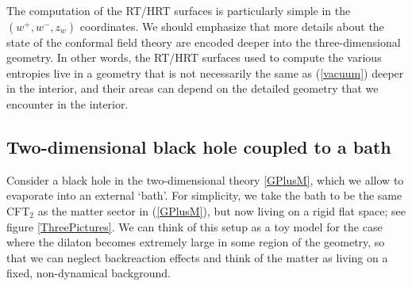 \documentclass[11pt]{article}
\def\nref#1{(\ref{#1})}
\begin{document}
The computation of the RT/HRT surfaces is particularly simple in the $(w^+,w^-,z_w)$ coordinates.
We should emphasize that more details about the state of the conformal field theory are encoded deeper into the three-dimensional geometry.
In other words, the RT/HRT surfaces used to compute the various entropies live in a geometry that is not necessarily the same as \nref{vacuum} deeper in the interior, and their areas can depend on the detailed geometry that we  encounter in the interior.

\subsection{Two-dimensional black hole coupled to a bath}

Consider a black hole in the two-dimensional theory \eqref{GPlusM}, which we allow to evaporate into an external `bath'.
For simplicity, we take the bath to be the same CFT$_2$ as the matter sector in (\ref{GPlusM}), but now living on a rigid flat space; see figure \ref{ThreePictures}.
We can think of this setup as a toy model for the case where the dilaton becomes extremely large in some region of the geometry, so that we can neglect backreaction effects and think of the matter as living on a fixed, non-dynamical background. 
\end{document}

